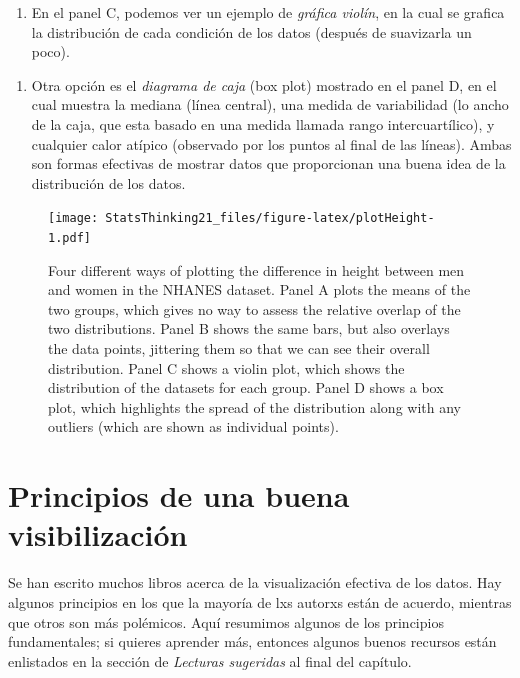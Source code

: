 \documentclass[
  12pt,
]{book}
\providecommand{\tightlist}{%
  \setlength{\itemsep}{0pt}\setlength{\parskip}{0pt}}
\begin{document}
\begin{enumerate}
\def\labelenumi{\arabic{enumi}.}
\setcounter{enumi}{2}
\tightlist
\item
  En el panel C, podemos ver un ejemplo de \emph{gráfica violín}, en la cual se grafica la distribución de cada condición de los datos (después de suavizarla un poco).
\end{enumerate}

\begin{enumerate}
\def\labelenumi{\arabic{enumi}.}
\setcounter{enumi}{3}
\tightlist
\item
  Otra opción es el \emph{diagrama de caja} (box plot) mostrado en el panel D, en el cual muestra la mediana (línea central), una medida de variabilidad (lo ancho de la caja, que esta basado en una medida llamada rango intercuartílico), y cualquier calor atípico (observado por los puntos al final de las líneas). Ambas son formas efectivas de mostrar datos que proporcionan una buena idea de la distribución de los datos.
\end{enumerate}

\begin{figure}
\centering
\texttt{[image: StatsThinking21\_files/figure-latex/plotHeight-1.pdf]}
\caption{\label{fig:plotHeight}Four different ways of plotting the difference in height between men and women in the NHANES dataset. Panel A plots the means of the two groups, which gives no way to assess the relative overlap of the two distributions. Panel B shows the same bars, but also overlays the data points, jittering them so that we can see their overall distribution. Panel C shows a violin plot, which shows the distribution of the datasets for each group. Panel D shows a box plot, which highlights the spread of the distribution along with any outliers (which are shown as individual points).}
\end{figure}

\hypertarget{principios-de-una-buena-visibilizaciuxf3n}{%
\section{Principios de una buena visibilización}\label{principios-de-una-buena-visibilizaciuxf3n}}

Se han escrito muchos libros acerca de la visualización efectiva de los datos. Hay algunos principios en los que la mayoría de lxs autorxs están de acuerdo, mientras que otros son más polémicos. Aquí resumimos algunos de los principios fundamentales; si quieres aprender más, entonces algunos buenos recursos están enlistados en la sección de \emph{Lecturas sugeridas} al final del capítulo.
\end{document}
